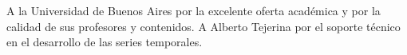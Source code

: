 \documentclass[
    11pt,
    spanish,
    singlespacing,
    parskip,
    headsepline,
    bookmarks=true,
    unicode=true,
    pdftoolbar=true,
    pdfmenubar=true,
    pdffitwindow=false,
    colorlinks=true,
    linkcolor=blue,
    citecolor=blue,
    urlcolor=blue
]{MastersDoctoralThesis}
\def\textbf#1{#1}%
\begin{document}
\begin{acknowledgements}
\vspace{1.5cm}
A la Universidad de Buenos Aires por la excelente oferta académica y por la calidad de sus profesores y contenidos. A Alberto Tejerina por el soporte técnico en el desarrollo de las series temporales.
\end{acknowledgements}


\tableofcontents
\listoffigures
\listoftables




\mainmatter %
\pagestyle{thesis} %








\appendix




\renewcommand{\bibname}{Bibliografía} %

\printbibliography[heading=bibintoc]
\end{document}
